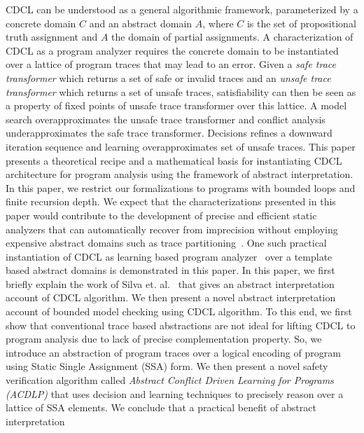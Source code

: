 CDCL can be understood as a general algorithmic framework, parameterized 
by a concrete domain $C$ and an abstract domain $A$, where $C$ is the 
set of propositional truth assignment and $A$ the domain of partial assignments.  
A characterization 
of CDCL as a program analyzer requires the concrete domain to 
be instantiated over a lattice of program traces that may lead to an error.  
Given a \emph{safe trace transformer} which returns a set of safe or 
invalid traces and an \emph{unsafe trace transformer} which returns a set 
of unsafe traces, satisfiability can then be seen as a property of fixed points of
unsafe trace transformer over this lattice.  A model search
overapproximates the unsafe trace transformer and conflict analysis
underapproximates the safe trace transformer.  Decisions refines a downward
iteration sequence and learning overapproximates set 
of unsafe traces.  This paper presents a theoretical recipe and a mathematical
basis for instantiating CDCL architecture for program analysis using the
framework of abstract interpretation.  
In this paper, we restrict our formalizations to programs 
with bounded loops and finite recursion depth.
We expect that the characterizations presented in this paper would contribute 
to the development of precise and efficient static analyzers that can 
automatically recover from imprecision without employing expensive 
abstract domains such as trace partitioning~\cite{toplas07}.  
One such practical instantiation of CDCL as learning based program
analyzer~\cite{atva2017}  over a template based abstract domains is 
demonstrated in this paper. 
%
%
In this paper, we first briefly explain the work of Silva et. al.~\cite{sas12,
popl2014} that gives an abstract interpretation account of CDCL algorithm. 
We then present a novel abstract interpretation account of bounded model
checking using CDCL algorithm.  To this end, we first show that conventional
trace based abstractions are not ideal for lifting CDCL to program analysis due
to lack of precise complementation property. So,
we introduce an abstraction of program traces over a logical encoding of program 
using Static Single Assignment (SSA) form.  We then present a novel safety
verification algorithm called \emph{Abstract Conflict Driven Learning for Programs (ACDLP)} 
that uses decision and learning techniques to precisely reason over a lattice of
SSA elements.  We conclude that a practical benefit of abstract interpretation 
